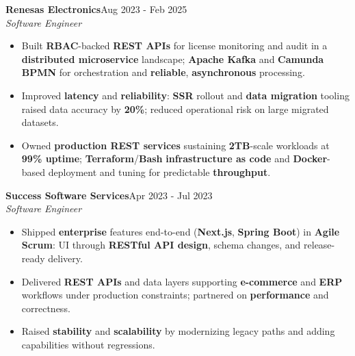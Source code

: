 \documentclass[a4paper]{article}
\begin{document}
{\textbf{Renesas Electronics}}\hfill Aug 2023 - Feb 2025 \\
{\textit{Software Engineer}} \
\vspace{-2mm}
\begin{itemize}
      \item Built \textbf{RBAC}-backed \textbf{REST APIs} for license monitoring and audit in a \textbf{distributed microservice} landscape; \textbf{Apache Kafka} and \textbf{Camunda BPMN} for orchestration and \textbf{reliable}, \textbf{asynchronous} processing.
            \vspace{-2.5mm}
      \item Improved \textbf{latency} and \textbf{reliability}: \textbf{SSR} rollout and \textbf{data migration} tooling raised data accuracy by \textbf{20\%}; reduced operational risk on large migrated datasets.
            \vspace{-2.5mm}
      \item Owned \textbf{production REST services} sustaining \textbf{2TB}-scale workloads at \textbf{99\% uptime}; \textbf{Terraform}/\textbf{Bash} \textbf{infrastructure as code} and \textbf{Docker}-based deployment and tuning for predictable \textbf{throughput}.
\end{itemize}
\vspace{-1.5mm}

{\textbf{Success Software Services}}\hfill Apr 2023 - Jul 2023 \\
{\textit{Software Engineer}} \
\vspace{-2mm}
\begin{itemize}
      \item Shipped \textbf{enterprise} features end-to-end (\textbf{Next.js}, \textbf{Spring Boot}) in \textbf{Agile Scrum}: UI through \textbf{RESTful API design}, schema changes, and release-ready delivery.
            \vspace{-2.5mm}
      \item Delivered \textbf{REST APIs} and data layers supporting \textbf{e-commerce} and \textbf{ERP} workflows under production constraints; partnered on \textbf{performance} and correctness.
            \vspace{-2.5mm}
      \item Raised \textbf{stability} and \textbf{scalability} by modernizing legacy paths and adding capabilities without regressions.
\end{itemize}
\vspace{-1.5mm}
\end{document}
